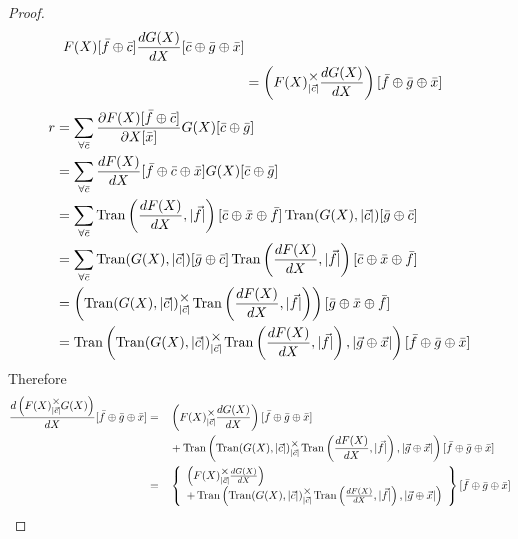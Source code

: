 \documentclass[12pt]{book}
\theoremstyle{definition}
\theoremstyle{plain}
\theoremstyle{ppart}
\theoremstyle{case}
\theoremstyle{solution}
\DeclareMathOperator{\Tran}{Tran}
\newcommand{\mmult}[1]{\text{\raisebox{1ex}{$\underset{#1}{\times}$}}}
\begin{document}
\begin{landscape}
\begin{proof}
\begin{align*}
    F(X)[\bar{f} \oplus \bar{c}]
    \frac{dG(X)}{dX}[\bar{c} \oplus \bar{g} \oplus \bar{x}] \\
 &=
   \left( F(X) \mmult{|\vec{c}|} \frac{dG(X)}{dX} \right)
   [\bar{f} \oplus \bar{g} \oplus \bar{x}]
\end{align*}
\begin{align*}
 r
 &=
  \sum_{\forall \bar{c}}
    \frac{\partial F(X)[\bar{f} \oplus \bar{c}]}{\partial X[\bar{x}]}
    G(X)[\bar{c} \oplus \bar{g}] \\
 &=
  \sum_{\forall \bar{c}}
    \frac{dF(X)}{dX}[\bar{f} \oplus \bar{c} \oplus \bar{x}]
    G(X)[\bar{c} \oplus \bar{g}] \\
 &=
  \sum_{\forall \bar{c}}
    \Tran\left(\frac{dF(X)}{dX}, |\vec{f}|\right)
      [\bar{c} \oplus \bar{x} \oplus \bar{f}]
    \Tran(G(X), |\vec{c}|)[\bar{g} \oplus \bar{c}] \\
 &=
  \sum_{\forall \bar{c}}
    \Tran(G(X), |\vec{c}|)[\bar{g} \oplus \bar{c}]
    \Tran\left(\frac{dF(X)}{dX}, |\vec{f}|\right)
      [\bar{c} \oplus \bar{x} \oplus \bar{f}] \\
 &=
  \left(
    \Tran(G(X), |\vec{c}|) \mmult{|\vec{c}|}
    \Tran\left(\frac{dF(X)}{dX}, |\vec{f}|\right)
  \right)[\bar{g} \oplus \bar{x} \oplus \bar{f}] \\
 &= 
  \Tran\left(
    \Tran(G(X), |\vec{c}|) \mmult{|\vec{c}|}
    \Tran\left(\frac{dF(X)}{dX}, |\vec{f}|\right)
    , |\vec{g} \oplus \vec{x}|
  \right)[\bar{f} \oplus \bar{g} \oplus \bar{x}]
\end{align*}
Therefore 
\begin{alignat*}{3}
 \frac{d\left(F(X) \mmult{|\vec{c}|} G(X)\right)}{dX}
  [\bar{f} \oplus \bar{g} \oplus \bar{x}]
  &=&&
  \left( F(X) \mmult{|\vec{c}|} \frac{dG(X)}{dX} \right)
  [\bar{f} \oplus \bar{g} \oplus \bar{x}] \\
  &&&+
  \Tran\left(
    \Tran(G(X), |\vec{c}|) \mmult{|\vec{c}|}
    \Tran\left(\frac{dF(X)}{dX}, |\vec{f}|\right)
    , |\vec{g} \oplus \vec{x}|
  \right)[\bar{f} \oplus \bar{g} \oplus \bar{x}] \\
  &=&&
  \left\{
    \begin{array}{l}
      \left( F(X) \mmult{|\vec{c}|} \frac{dG(X)}{dX} \right) \\
      +
      \Tran\left(
        \Tran(G(X), |\vec{c}|) \mmult{|\vec{c}|}
        \Tran\left(\frac{dF(X)}{dX}, |\vec{f}|\right)
        , |\vec{g} \oplus \vec{x}|
      \right)
    \end{array}
  \right\}
  [\bar{f} \oplus \bar{g} \oplus \bar{x}]
\end{alignat*}
\end{proof}
\end{landscape}
\end{document}
